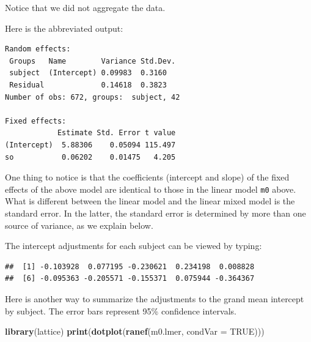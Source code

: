 \documentclass[12pt,]{krantz}
\newenvironment{Shaded}{\begin{snugshade}}{\end{snugshade}}
\newcommand{\CommentTok}[1]{\textcolor[rgb]{0.56,0.35,0.01}{\textit{#1}}}
\newcommand{\DataTypeTok}[1]{\textcolor[rgb]{0.13,0.29,0.53}{#1}}
\newcommand{\DecValTok}[1]{\textcolor[rgb]{0.00,0.00,0.81}{#1}}
\newcommand{\KeywordTok}[1]{\textcolor[rgb]{0.13,0.29,0.53}{\textbf{#1}}}
\newcommand{\NormalTok}[1]{#1}
\newcommand{\OperatorTok}[1]{\textcolor[rgb]{0.81,0.36,0.00}{\textbf{#1}}}
\newcommand{\OtherTok}[1]{\textcolor[rgb]{0.56,0.35,0.01}{#1}}
\begin{document}
Notice that we did not aggregate the data.

Here is the abbreviated output:

\begin{verbatim}
Random effects:
 Groups   Name        Variance Std.Dev.
 subject  (Intercept) 0.09983  0.3160  
 Residual             0.14618  0.3823  
Number of obs: 672, groups:  subject, 42

Fixed effects:
            Estimate Std. Error t value
(Intercept)  5.88306    0.05094 115.497
so           0.06202    0.01475   4.205
\end{verbatim}

One thing to notice is that the coefficients (intercept and slope) of the fixed effects of the above model are identical to those in the linear model \texttt{m0} above. What is different between the linear model and the linear mixed model is the standard error. In the latter, the standard error is determined by more than one source of variance, as we explain below.

The intercept adjustments for each subject can be viewed by typing:

\begin{Shaded}
\end{Shaded}

\begin{verbatim}
##  [1] -0.103928  0.077195 -0.230621  0.234198  0.008828
##  [6] -0.095363 -0.205571 -0.155371  0.075944 -0.364367
\end{verbatim}

Here is another way to summarize the adjustments to the grand mean intercept by subject. The error bars represent 95\% confidence intervals.

\begin{Shaded}
\begin{Highlighting}[]
\KeywordTok{library}\NormalTok{(lattice)}
\KeywordTok{print}\NormalTok{(}\KeywordTok{dotplot}\NormalTok{(}\KeywordTok{ranef}\NormalTok{(m0.lmer, }\DataTypeTok{condVar =} \OtherTok{TRUE}\NormalTok{)))}
\end{Highlighting}
\end{Shaded}
\end{document}

